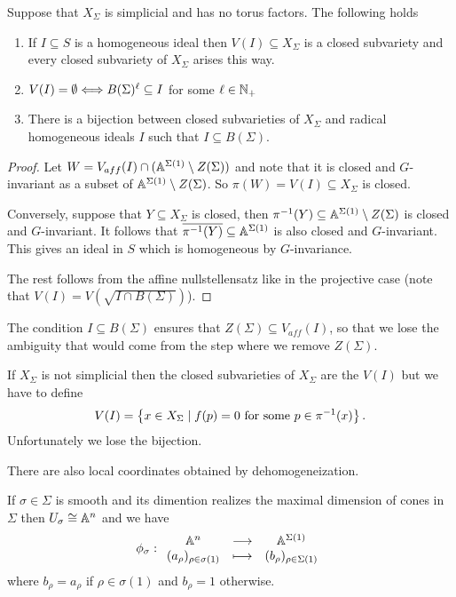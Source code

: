 \begin{proposition}[]\label{PrToricNullstellensatz}
Suppose that $X_\Sigma$ is simplicial and has no torus factors. The following holds
\begin{enumerate}
\item If $I\subseteq S$ is a homogeneous ideal then $V(I)\subseteq X_\Sigma$ is a closed subvariety and every closed subvariety of $X_\Sigma$ arises this way.
\item $V(I)=\emptyset\Longleftrightarrow B(\Sigma)^\ell\subseteq I$ for some $\ell\in \mathbb{N}_+$
\item There is a bijection between closed subvarieties of $X_\Sigma$ and radical homogeneous ideals $I$ such that $I\subseteq B(\Sigma)$.
\end{enumerate}
\end{proposition}
\begin{proof}
Let $W=V_{aff}(I)\cap (\mathbb{A}^{\Sigma(1)}\setminus Z(\Sigma))$ and note that it is closed and $G$-invariant as a subset of $\mathbb{A}^{\Sigma(1)}\setminus Z(\Sigma)$. So $\pi(W)=V(I)\subseteq X_\Sigma$ is closed.

Conversely, suppose that $Y\subseteq X_\Sigma$ is closed, then $\pi^{-1}(Y)\subseteq \mathbb{A}^{\Sigma(1)}\setminus Z(\Sigma)$ is closed and $G$-invariant. It follows that $\overline{\pi^{-1}(Y)}\subseteq \mathbb{A}^{\Sigma(1)}$ is also closed and $G$-invariant. This gives an ideal in $S$ which is homogeneous by $G$-invariance.


The rest follows from the affine nullstellensatz like in the projective case (note that $V(I)=V(\sqrt{I\cap B(\Sigma)})$).
\end{proof}

\begin{remark}
The condition $I\subseteq B(\Sigma)$ ensures that $Z(\Sigma)\subseteq V_{aff}(I)$, so that we lose the ambiguity that would come from the step where we remove $Z(\Sigma)$.
\end{remark}


\begin{remark}
If $X_\Sigma$ is not simplicial then the closed subvarieties of $X_\Sigma$ are the $V(I)$ but we have to define
\[V(I)=\left\{{x\in X_\Sigma\mid f(p)=0\ \text{for some }p\in \pi^{-1}(x)}\right\}.\]
Unfortunately we lose the bijection.
\end{remark}


There are also local coordinates obtained by dehomogeneization.

If $\sigma\in \Sigma$ is smooth and its dimention realizes the maximal dimension of cones in $\Sigma$ then $U_\sigma\cong \mathbb{A}^n$ and we have
\[\phi_\sigma:\begin{array}{ccc} {\mathbb{A}^n} & \longrightarrow & {\mathbb{A}^{\Sigma(1)}}\\ {(a_\rho)_{\rho\in \sigma(1)}} & \longmapsto & {(b_\rho)_{\rho\in \Sigma(1)}} \end{array}\]
where $b_\rho=a_\rho$ if $\rho\in \sigma(1)$ and $b_\rho=1$ otherwise.


